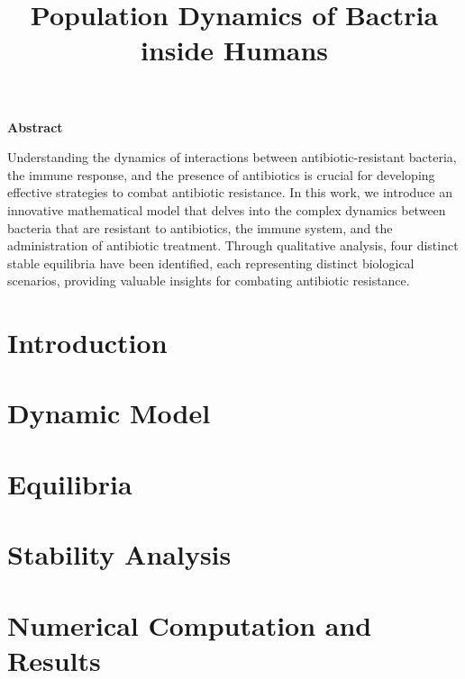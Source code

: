 \documentclass[12pt]{article}
\title{Population Dynamics of Bactria inside Humans}
\date{}
\theoremstyle{definition}
\begin{document}
	\graphicspath{{../figs/}}
	
	
	
	\newpage
	\setcounter{page}{2}
	
	\begin{center}
		\LARGE{\textbf{Abstract}}
		
		\vspace{1cm}
		
		
	\end{center}
	
	\begin{flushleft}
		\Large 
		Understanding the dynamics of interactions between antibiotic-resistant 	bacteria, the immune
		response, and the presence of antibiotics is crucial for developing effective strategies to combat
		antibiotic resistance. In this work, we introduce an innovative mathematical model that delves
		into the complex dynamics between bacteria that are resistant to antibiotics, the immune
		system, and the administration of antibiotic treatment. Through qualitative analysis, four
		distinct stable equilibria have been identified, each representing distinct biological scenarios,
		providing valuable insights for combating antibiotic resistance.
		
	\end{flushleft}
	
	\newpage	
	
	\tableofcontents
	
	\newpage
	
	\section{Introduction} 
	
	
	\newpage
	\section{Dynamic Model} 
	
	
	\newpage
	\section{Equilibria} 
	
	
	\newpage
	\section{Stability Analysis} 
	
	
	\newpage
	\section{Numerical Computation and Results} 
	
	
	\newpage
	\nocite{*}
	\printbibliography
	
	
\end{document}
